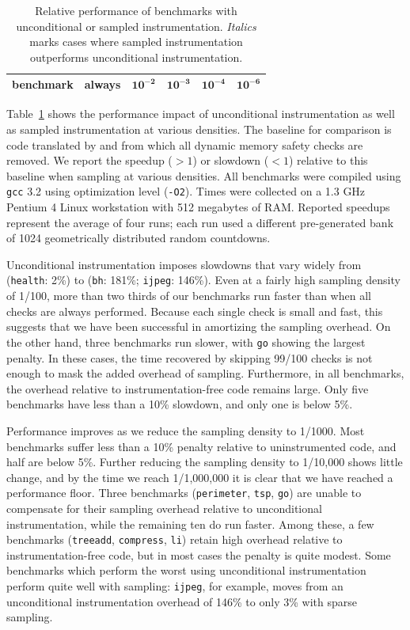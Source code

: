 \begin{table}
  \centering
  \begin{tabular}{|l|r|rrrr|}
    \hline
    \rule{0pt}{2.5ex}
    \textbf{benchmark} & \textbf{always} & $\mathbf{10^{-2}}$ & $\mathbf{10^{-3}}$ & $\mathbf{10^{-4}}$ & $\mathbf{10^{-6}}$ \\
    \hline\hline
    
  \end{tabular}
  \caption{Relative performance of \CCured benchmarks with
    unconditional or sampled instrumentation.  \textit{Italics} marks
    cases where sampled instrumentation outperforms unconditional
    instrumentation.}
  \label{tab:share:density}
\end{table}

Table~\ref{tab:share:density} shows the performance impact of
unconditional instrumentation as well as sampled instrumentation at
various densities.  The baseline for comparison is code
translated by \CCured and from which all dynamic memory
safety checks are removed.  We report the speedup ($>1$) or
slowdown ($<1$) relative to this baseline when sampling at various
densities.  All benchmarks were compiled using \texttt{gcc} 3.2 using
optimization level (\texttt{-O2}).  Times were collected on a 1.3
GHz Pentium 4 Linux workstation with 512 megabytes of RAM\@.  Reported
speedups represent the average of four runs; each run used a different
pre-generated bank of 1024 geometrically distributed random
countdowns.

Unconditional instrumentation imposes slowdowns that vary widely from 
(\texttt{health}: 2\%) to (\texttt{bh}: 181\%;
\texttt{ijpeg}: 146\%).  Even at a fairly high sampling density of
1/100, more than two thirds of our benchmarks run faster than
when all checks are always performed.  Because each single check
is small and fast, this suggests that we have been successful in
amortizing the sampling overhead.  On the other hand, three benchmarks
run slower, with \texttt{go} showing the largest penalty.  In these
cases, the time recovered by skipping 99/100 checks is not enough to
mask the added overhead of sampling.  Furthermore, in all benchmarks,
the overhead relative to instrumentation-free code remains large.
Only five benchmarks have less than a 10\% slowdown, and only one is
below 5\%.

Performance improves as we reduce the sampling density to 1/1000.
Most benchmarks suffer less than a 10\% penalty relative to
uninstrumented code, and half are below 5\%.  Further reducing the
sampling density to 1/10,000 shows little change, and by the time we
reach 1/1,000,000 it is clear that we have reached a performance
floor.  Three benchmarks (\texttt{perimeter}, \texttt{tsp},
\texttt{go}) are unable to compensate for their sampling overhead
relative to unconditional instrumentation, while the remaining ten do
run faster.  Among these, a few benchmarks (\texttt{treeadd},
\texttt{compress}, \texttt{li}) retain high overhead relative to
instrumentation-free code, but in most cases the penalty is quite
modest.  Some benchmarks which perform the worst using unconditional
instrumentation perform quite well with sampling: \texttt{ijpeg}, for
example, moves from an unconditional instrumentation overhead of 146\%
to only 3\% with sparse sampling.


